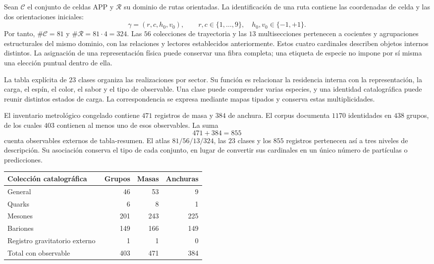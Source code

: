 Sean \(\mathcal C\) el conjunto de celdas APP y \(\mathcal R\) su dominio
de rutas orientadas. La identificación de una ruta contiene las coordenadas
de celda y las dos orientaciones iniciales:
\[
 \gamma=(r,c,h_0,v_0),\qquad
 r,c\in\{1,\ldots,9\},\quad h_0,v_0\in\{-1,+1\}.
\]
Por tanto, \(\#\mathcal C=81\) y \(\#\mathcal R=81\cdot4=324\).
Las \(56\) colecciones de trayectoria y las \(13\) multisecciones pertenecen
a cocientes y agrupaciones estructurales del mismo dominio, con las
relaciones y lectores establecidos anteriormente. Estos cuatro cardinales
describen objetos internos distintos. La asignación de una representación
física puede conservar una fibra completa; una etiqueta de especie no
impone por sí misma una elección puntual dentro de ella.

La tabla explícita de \(23\) clases organiza las realizaciones por sector.
Su función es relacionar la residencia interna con la representación, la
carga, el espín, el color, el sabor y el tipo de observable. Una clase puede
comprender varias especies, y una identidad catalográfica puede reunir
distintos estados de carga. La correspondencia se expresa mediante mapas
tipados y conserva estas multiplicidades.

El inventario metrológico congelado contiene \(471\) registros de masa y
\(384\) de anchura. El corpus documenta \(1170\) identidades en \(438\)
grupos, de los cuales \(403\) contienen al menos uno de esos observables.
La suma
\[
 471+384=855
\]
cuenta observables externos de tabla-resumen. El atlas \(81/56/13/324\),
las \(23\) clases y los \(855\) registros pertenecen así a tres niveles
de descripción. Su asociación conserva el tipo de cada conjunto, en lugar
de convertir sus cardinales en un único número de partículas o predicciones.

\begin{center}
\begin{tabular}{p{0.49\linewidth}rrr}
\toprule
Colección catalográfica & Grupos & Masas & Anchuras\\
\midrule
General & 46 & 53 & 9\\
Quarks & 6 & 8 & 1\\
Mesones & 201 & 243 & 225\\
Bariones & 149 & 166 & 149\\
Registro gravitatorio externo & 1 & 1 & 0\\
\midrule
Total con observable & 403 & 471 & 384\\
\bottomrule
\end{tabular}
\end{center}


